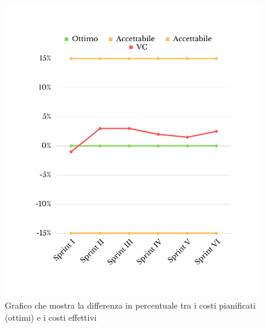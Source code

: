 \begin{figure}[H]
	\centering
	\includegraphics[scale=0.5]{img/CV.png}
	\caption{Grafico che mostra la differenza in percentuale tra i costi pianificati (ottimi) e i costi effettivi}
\end{figure}
